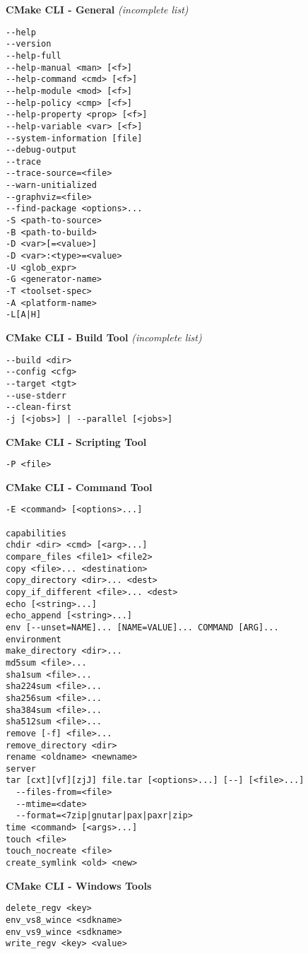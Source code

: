 \documentclass{article}
\begin{document}
\begin{minipage}[t]{0.18\linewidth}
\textbf{CMake CLI - General}
{\tiny \em (incomplete list)}
\begin{verbatim}
--help
--version
--help-full
--help-manual <man> [<f>]
--help-command <cmd> [<f>]
--help-module <mod> [<f>]
--help-policy <cmp> [<f>]
--help-property <prop> [<f>]
--help-variable <var> [<f>]
--system-information [file]
--debug-output
--trace
--trace-source=<file>
--warn-unitialized
--graphviz=<file>
--find-package <options>...
-S <path-to-source>
-B <path-to-build>
-D <var>[=<value>]
-D <var>:<type>=<value>
-U <glob_expr>
-G <generator-name>
-T <toolset-spec>
-A <platform-name>
-L[A|H]
\end{verbatim}
\textbf{CMake CLI - Build Tool}
{\tiny \em (incomplete list)}
\begin{verbatim}
--build <dir>
--config <cfg>
--target <tgt>
--use-stderr
--clean-first
-j [<jobs>] | --parallel [<jobs>]
\end{verbatim}
\textbf{CMake CLI - Scripting Tool}
\begin{verbatim}
-P <file>
\end{verbatim}
\textbf{CMake CLI - Command Tool}
\begin{verbatim}
-E <command> [<options>...]

capabilities
chdir <dir> <cmd> [<arg>...]
compare_files <file1> <file2>
copy <file>... <destination>
copy_directory <dir>... <dest>
copy_if_different <file>... <dest>
echo [<string>...]
echo_append [<string>...]
env [--unset=NAME]... [NAME=VALUE]... COMMAND [ARG]...
environment
make_directory <dir>...
md5sum <file>...
sha1sum <file>...
sha224sum <file>...
sha256sum <file>...
sha384sum <file>...
sha512sum <file>...
remove [-f] <file>...
remove_directory <dir>
rename <oldname> <newname>
server
tar [cxt][vf][zjJ] file.tar [<options>...] [--] [<file>...]
  --files-from=<file>
  --mtime=<date>
  --format=<7zip|gnutar|pax|paxr|zip>
time <command> [<args>...]
touch <file>
touch_nocreate <file>
create_symlink <old> <new>
\end{verbatim}
\textbf{CMake CLI - Windows Tools}
\begin{verbatim}
delete_regv <key>
env_vs8_wince <sdkname>
env_vs9_wince <sdkname>
write_regv <key> <value>
\end{verbatim}
\end{minipage}

\pagebreak

\end{document}
